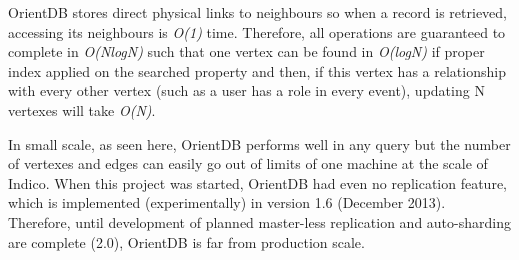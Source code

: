 OrientDB stores direct physical links to neighbours so when a record is retrieved, accessing its neighbours is \textit{O(1)} time. Therefore, all operations are guaranteed to complete in \textit{O(NlogN)} such that one vertex can be found in \textit{O(logN)} if proper index applied on the searched property and then, if this vertex has a relationship with every other vertex (such as a user has a role in every event), updating N vertexes will take \textit{O(N)}.

In small scale, as seen here, OrientDB performs well in any query but the number of vertexes and edges can easily go out of limits of one machine at the scale of Indico. When this project was started, OrientDB had even no replication feature, which is implemented (experimentally) in version 1.6 (December 2013). Therefore, until development of planned master-less replication and auto-sharding are complete (2.0), OrientDB is far from production scale.
